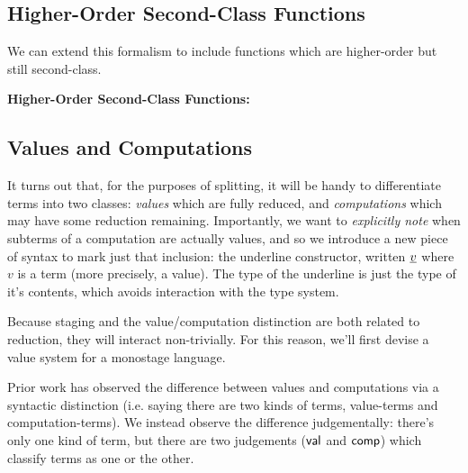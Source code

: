 \documentclass[]{article}
\begin{document}
\begin{abstrsyn}
\subsection{Higher-Order Second-Class Functions}

We can extend this formalism to include functions which are higher-order but still second-class.

\begin{framed}
\noindent\textbf{Higher-Order Second-Class Functions:}
\end{framed}

\subsection{Values and Computations}

It turns out that, for the purposes of splitting, it will be handy to differentiate terms into two classes: 
\emph{values} which are fully reduced, and \emph{computations} which may have some reduction remaining.
Importantly, we want to \emph{explicitly note} when subterms of a computation are actually values,
and so we introduce a new piece of syntax to mark just that inclusion: the underline constructor, written $\underline{v}$
where $v$ is a term (more precisely, a value).  
The type of the underline is just the type of it's contents, which avoids interaction with the type system.

Because staging and the value/computation distinction are both related to reduction, they will interact non-trivially.
For this reason, we'll first devise a value system for a monostage language.

Prior work has observed the difference between values and computations
via a syntactic distinction (i.e. saying there are two kinds of terms, value-terms and computation-terms).
We instead observe the difference judgementally: there's only one kind of term, 
but there are two judgements ($\mathsf{val}$ and $\mathsf{comp}$) which classify terms as one or the other.


\end{abstrsyn}
\end{document}
